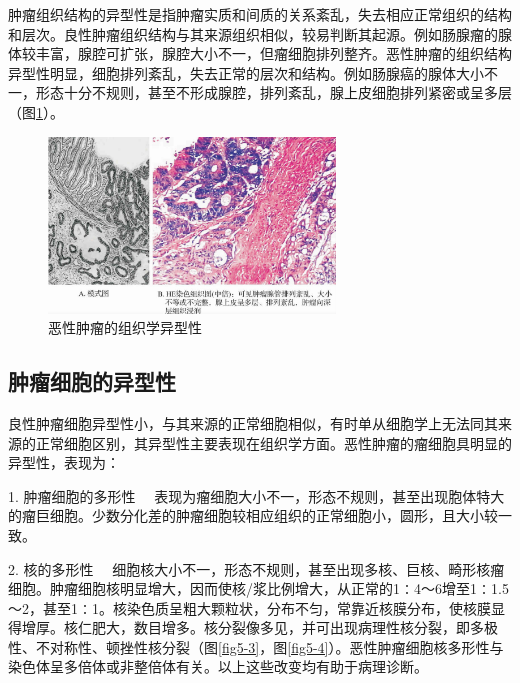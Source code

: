 肿瘤组织结构的异型性是指肿瘤实质和间质的关系紊乱，失去相应正常组织的结构和层次。良性肿瘤组织结构与其来源组织相似，较易判断其起源。例如肠腺瘤的腺体较丰富，腺腔可扩张，腺腔大小不一，但瘤细胞排列整齐。恶性肿瘤的组织结构异型性明显，细胞排列紊乱，失去正常的层次和结构。例如肠腺癌的腺体大小不一，形态十分不规则，甚至不形成腺腔，排列紊乱，腺上皮细胞排列紧密或呈多层（图\ref{fig5-2}）。

\begin{figure}[!htbp]
 \centering
 \includegraphics[width=0.68\textwidth]{./images/Image00069.jpg}
 \caption{恶性肿瘤的组织学异型性}
 \label{fig5-2}
  \end{figure}

\subsection{肿瘤细胞的异型性}

良性肿瘤细胞异型性小，与其来源的正常细胞相似，有时单从细胞学上无法同其来源的正常细胞区别，其异型性主要表现在组织学方面。恶性肿瘤的瘤细胞具明显的异型性，表现为：

{1. 肿瘤细胞的多形性}
　表现为瘤细胞大小不一，形态不规则，甚至出现胞体特大的瘤巨细胞。少数分化差的肿瘤细胞较相应组织的正常细胞小，圆形，且大小较一致。

{2. 核的多形性}
　细胞核大小不一，形态不规则，甚至出现多核、巨核、畸形核瘤细胞。肿瘤细胞核明显增大，因而使核/浆比例增大，从正常的1∶4～6增至1∶1.5～2，甚至1∶1。核染色质呈粗大颗粒状，分布不匀，常靠近核膜分布，使核膜显得增厚。核仁肥大，数目增多。核分裂像多见，并可出现病理性核分裂，即多极性、不对称性、顿挫性核分裂（图\ref{fig5-3}，图\ref{fig5-4}）。恶性肿瘤细胞核多形性与染色体呈多倍体或非整倍体有关。以上这些改变均有助于病理诊断。

